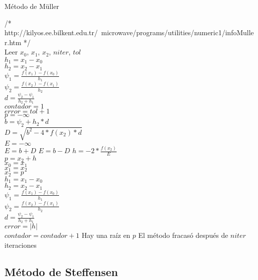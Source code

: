 \documentclass[12pt]{article}
\begin{document}
\begin{algorithm}[H]
	
	\caption{Método de Müller}
	\SetAlgoLined
	/* http://kilyos.ee.bilkent.edu.tr/~microwave/programs/utilities/numeric1/infoMuller.htm */ \\
	Leer $x_0$, $x_1$, $x_2$, $niter$, $tol$\\
	$h_1 = x_1 - x_0$\\
	$h_2 = x_2 - x_1$\\
	$\psi_1 = \frac{f(x_1) - f(x_0)}{h_1}$\\
	$\psi_2 = \frac{f(x_2) - f(x_1)}{h_2}$\\
	$d = \frac{\psi_2 - \psi_1}{h_2 + h_1}$\\
	$contador = 1$\\
	$error = tol + 1$\\
	$p = -\infty$\\
	{
		$b = \psi_2 + h_2*d$\\
		$D = \sqrt{b^2 - 4*f(x_2)*d}$\\
		$E = -\infty$\\
		{$E = b + D$}
		{$E = b - D$}
		$h = -2 * \frac{f(x_2)}{E}$\\
		$p = x_2 + h$\\
		$x_0 = x_1$\\
		$x_1 = x_2$\\
		$x_2 = p$\\
		$h_1 = x_1 - x_0$\\
		$h_2 = x_2 - x_1$\\
		$\psi_1 = \frac{f(x_1) - f(x_0)}{h_1}$\\
		$\psi_2 = \frac{f(x_2) - f(x_1)}{h_2}$\\
		$d = \frac{\psi_2 - \psi_1}{h_2 + h_1}$\\
		$error = |h|$\\
		$contador = contador + 1$
	}
	{Hay una raíz en $p$}
	{El método fracasó después de $niter$ iteraciones}
\end{algorithm}

\subsection{Método de Steffensen}
\end{document}
